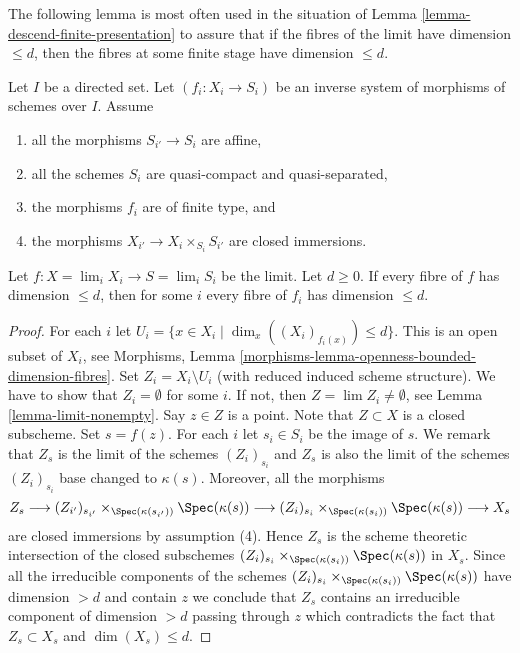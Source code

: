 \noindent
The following lemma is most often used in the situation of
Lemma \ref{lemma-descend-finite-presentation}
to assure that if the fibres of the limit have dimension $\leq d$,
then the fibres at some finite stage have dimension $\leq d$.

\begin{lemma}
\label{lemma-limit-dimension}
Let $I$ be a directed set.
Let $(f_i : X_i \to S_i)$ be an inverse system of morphisms of schemes
over $I$. Assume
\begin{enumerate}
\item all the morphisms $S_{i'} \to S_i$ are affine,
\item all the schemes $S_i$ are quasi-compact and quasi-separated,
\item the morphisms $f_i$ are of finite type, and
\item the morphisms $X_{i'} \to X_i \times_{S_i} S_{i'}$ are closed
immersions.
\end{enumerate}
Let $f : X = \lim_i X_i \to S = \lim_i S_i$ be the limit.
Let $d \geq 0$.
If every fibre of $f$ has dimension $\leq d$, then for some $i$
every fibre of $f_i$ has dimension $\leq d$.
\end{lemma}

\begin{proof}
For each $i$ let $U_i = \{x \in X_i \mid \dim_x((X_i)_{f_i(x)}) \leq d\}$.
This is an open subset of $X_i$, see
Morphisms, Lemma \ref{morphisms-lemma-openness-bounded-dimension-fibres}.
Set $Z_i = X_i \setminus U_i$ (with reduced induced scheme structure).
We have to show that $Z_i = \emptyset$ for some $i$.
If not, then $Z = \lim Z_i \not = \emptyset$, see
Lemma \ref{lemma-limit-nonempty}.
Say $z \in Z$ is a point. Note that $Z \subset X$ is a closed subscheme.
Set $s = f(z)$. For each $i$ let $s_i \in S_i$ be the image
of $s$. We remark that $Z_s$ is the limit of the schemes $(Z_i)_{s_i}$
and $Z_s$ is also the limit of the schemes $(Z_i)_{s_i}$ base
changed to $\kappa(s)$. Moreover, all the morphisms
$$
Z_s
\longrightarrow
(Z_{i'})_{s_{i'}} \times_{\Spec(\kappa(s_{i'}))} \Spec(\kappa(s))
\longrightarrow
(Z_i)_{s_i} \times_{\Spec(\kappa(s_i))} \Spec(\kappa(s))
\longrightarrow
X_s
$$
are closed immersions by assumption (4). Hence $Z_s$ is the scheme
theoretic intersection of the closed subschemes
$(Z_i)_{s_i} \times_{\Spec(\kappa(s_i))} \Spec(\kappa(s))$
in $X_s$. Since all the irreducible components of the schemes
$(Z_i)_{s_i} \times_{\Spec(\kappa(s_i))} \Spec(\kappa(s))$
have dimension $> d$ and contain $z$ we conclude that
$Z_s$ contains an irreducible component of dimension $> d$ passing
through $z$ which contradicts the fact that $Z_s \subset X_s$ and
$\dim(X_s) \leq d$.
\end{proof}

